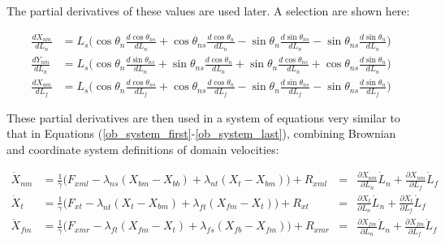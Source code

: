 \documentclass[10pt]{article} %
\begin{document}
The partial derivatives of these values are used later. A selection are shown here:

\begin{align}
  \frac{dX_{nm}}{dL_n} &= L_s\Big(\cos\theta_n\frac{d\cos\theta_{ns}}{dL_n} + \cos\theta_{ns}\frac{d\cos\theta_{n}}{dL_n} - \sin\theta_n\frac{d\sin\theta_{ns}}{dL_n} - \sin\theta_{ns}\frac{d\sin\theta_{n}}{dL_n}\Big)\\
  \frac{dY_{nm}}{dL_n} &= L_s\Big(\cos\theta_n\frac{d\sin\theta_{ns}}{dL_n} + \sin\theta_{ns}\frac{d\cos\theta_{n}}{dL_n} + \sin\theta_n\frac{d\cos\theta_{ns}}{dL_n} + \cos\theta_{ns}\frac{d\sin\theta_{n}}{dL_n} \Big)\\
  \frac{dX_{nm}}{dL_f} &= L_s\Big(\cos\theta_n\frac{d\cos\theta_{ns}}{dL_f} + \cos\theta_{ns}\frac{d\cos\theta_{n}}{dL_f} - \sin\theta_n\frac{d\sin\theta_{ns}}{dL_f} - \sin\theta_{ns}\frac{d\sin\theta_{n}}{dL_f} \Big)
\end{align}

These partial derivatives are then used in a system of equations very similar to that in Equations (\ref{ob_system_first}-\ref{ob_system_last}), combining Brownian and coordinate system definitions of domain velocities:

\begin{align}
  \dot{X}_{nm} &= \frac{1}{\gamma} \Big(F_{xml} - \lambda_{ns}(X_{bm} - X_{bb})
  + \lambda_{nt}(X_{t } - X_{bm}) \Big) + R_{xml}
  &=& \frac{\partial X_{nm}}{\partial L_n}\dot{L}_n + \frac{\partial X_{nm}}{\partial L_f}\dot{L}_f\\
  \dot{X}_{t } &= \frac{1}{\gamma} \Big(F_{xt } - \lambda_{nt}(X_{t } - X_{bm})
  + \lambda_{ft}(X_{fm} - X_{t }) \Big) + R_{xt }
  &=& \frac{\partial X_{t}}{\partial L_n}\dot{L}_n + \frac{\partial X_{t}}{\partial L_f}\dot{L}_f\\
  \dot{X}_{fm} &= \frac{1}{\gamma} \Big(F_{xmr} - \lambda_{ft}(X_{fm} - X_{t })
  + \lambda_{fs}(X_{fb} - X_{fm}) \Big) + R_{xmr}
  &=& \frac{\partial X_{fm}}{\partial L_n}\dot{L}_n + \frac{\partial X_{fm}}{\partial L_f}\dot{L}_f
\end{align}
\end{document}
